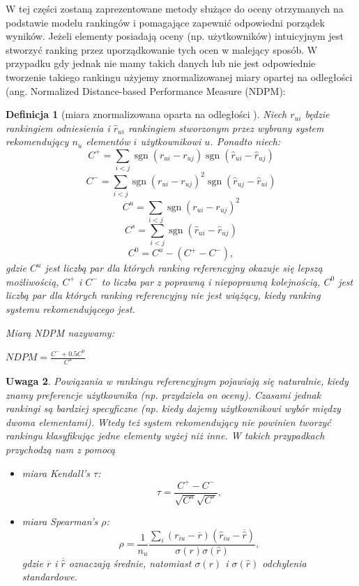 \documentclass[12pt,a4paper]{report}
\newtheorem{df}{Definicja}[chapter]
\newtheorem{uwaga}[df]{Uwaga}
\newcommand{\sgn}[1]{\operatorname{sgn}\left({#1} \right)}
\begin{document}
W tej części zostaną zaprezentowane metody służące do oceny otrzymanych na podstawie modelu rankingów i pomagające zapewnić odpowiedni porządek wyników. Jeżeli elementy posiadają oceny (np. użytkowników) intuicyjnym jest stworzyć ranking przez uporządkowanie tych ocen w malejący sposób. W przypadku gdy jednak nie mamy takich danych lub nie jest odpowiednie tworzenie takiego rankingu użyjemy znormalizowanej miary opartej na odległości (ang. Normalized Distance-based Performance Measure (NDPM): 
\begin{df}[miara znormalizowana oparta na odległości {\citep[Sec 2.2.1]{kidzinski}}]
Niech $r_{ui}$ będzie rankingiem odniesienia i $\widehat{r}_{ui}$ rankingiem stworzonym przez wybrany system rekomendujący $n_u$ elementów $i$ użytkownikowi $u$. 
Ponadto niech:
$$
C^{+} = \sum_{i<j} \sgn{r_{ui} - r_{uj}} \sgn{\widehat{r}_{ui}-\widehat{r}_{uj}}
$$
$$
C^{-} = \sum_{i<j} \sgn{r_{ui} - r_{uj}}^{2}\sgn{\widehat{r}_{uj}-\widehat{r}_{ui}}
$$
$$
C^{u} = \sum_{i<j} \sgn{r_{ui} - r_{uj}}^{2}
$$
$$
C^{s} = \sum_{i<j} \sgn{\widehat{r}_{ui}-\widehat{r}_{uj}}
$$
$$
C^{0}=C^{u}-(C^{+}-C^{-}),
$$ 
gdzie
$C^{u}$ jest liczbą par dla których ranking referencyjny okazuje się lepszą możliwością, 
$C^{+}$ i $C^{-}$ to liczba par z poprawną i niepoprawną kolejnością,
$C^{0}$ jest liczbą par dla których ranking referencyjny nie jest wiążący, kiedy ranking systemu rekomendującego jest.

Miarą NDPM nazywamy:
\begin{center}
$NDPM = \frac{C^{-} + 0.5 C^{0}}{C^{u}}$
\end{center}
\end{df}
\begin{uwaga}{\citep[Sec 2.2.1]{kidzinski}}
Powiązania w rankingu referencyjnym pojawiają się naturalnie, kiedy znamy preferencje użytkownika (np. przydziela on oceny). Czasami jednak rankingi są bardziej specyficzne (np. kiedy dajemy użytkownikowi wybór między dwoma elementami). Wtedy też system rekomendujący nie powinien tworzyć rankingu klasyfikując jedne elementy wyżej niż inne. W takich przypadkach przychodzą nam z pomocą 
\begin{itemize}
\item miara Kendall's $\tau$:
$$
\tau = \frac{C^{+} - C^{-} }{\sqrt{C^{u}}\sqrt{C^{s}}},
$$
\item miara Spearman's $\rho$:
$$
\rho = \frac{1}{n_{u}}\frac{\sum_i (r_{iu} - \overline{r})(\widehat{r}_{iu}-\overline{\widehat{r}})}{\sigma(r)\sigma(\widehat{r})},
$$
gdzie $\overline{r}$ i $\overline{\widehat{r}}$ oznaczają średnie, natomiast $\sigma(r)$ i $\sigma(\widehat{r})$ odchylenia standardowe.
\end{itemize}
\end{uwaga}
\end{document}
